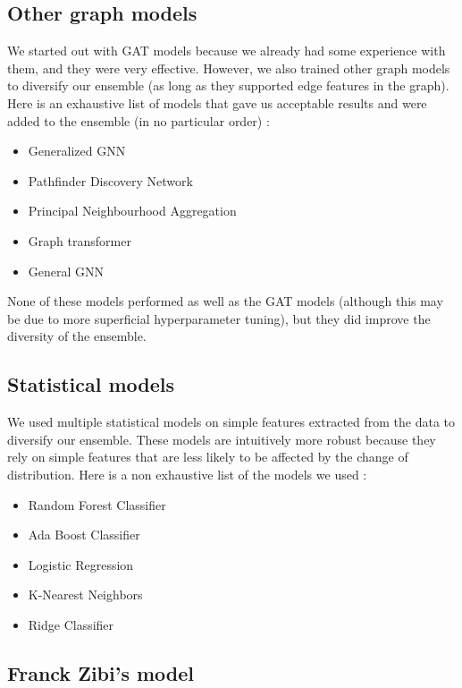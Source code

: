 \documentclass[switch, 11pt]{article}
\begin{document}
\begin{multicols}{2}
    \subsection{Other graph models}

    We started out with GAT models because we already had some experience with them, and they were very effective. However, we also trained other graph models to diversify our ensemble (as long as they supported edge features in the graph). Here is an exhaustive list of models that gave us acceptable results and were added to the ensemble (in no particular order) :
    \begin{itemize}
        \item Generalized GNN \cite{li-2020}
        \item Pathfinder Discovery Network \cite{rozemberczki-2021}
        \item Principal Neighbourhood Aggregation \cite{corso-2020}
        \item Graph transformer \cite{shi-2020}
        \item General GNN \cite{you-2020}
    \end{itemize}

    None of these models performed as well as the GAT models (although this may be due to more superficial hyperparameter tuning), but they did improve the diversity of the ensemble.

    \subsection{Statistical models}

    We used multiple statistical models on simple features extracted from the data to diversify our ensemble. These models are intuitively more robust because they rely on simple features that are less likely to be affected by the change of distribution. Here is a non exhaustive list of the models we used :
    \begin{itemize}
        \item Random Forest Classifier
        \item Ada Boost Classifier
        \item Logistic Regression
        \item K-Nearest Neighbors
        \item Ridge Classifier
    \end{itemize}

    \subsection{Franck Zibi's model}


\end{multicols}
\end{document}
